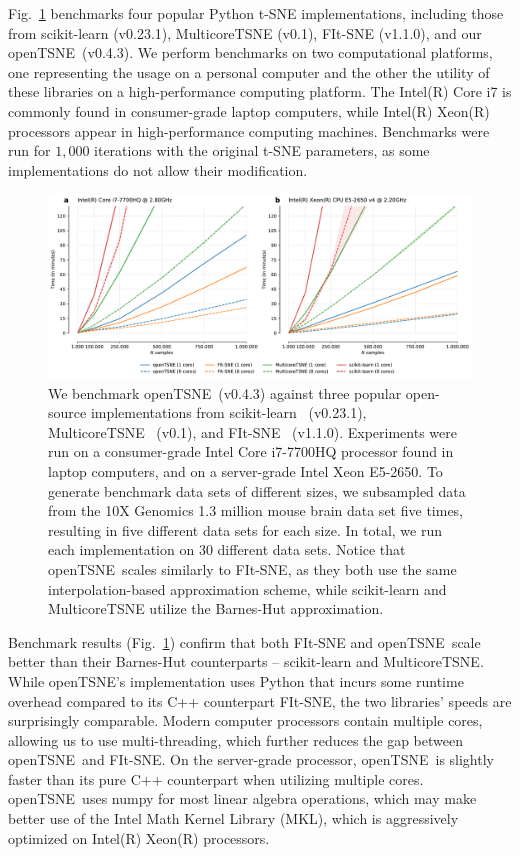 \documentclass[twocolumn]{bmcart}
\newcommand{\opentsne}{\textsf{openTSNE}}
\begin{document}
Fig.~\ref{fig:benchmarks} benchmarks four popular Python t-SNE implementations,
including those from \textsf{scikit-learn} (v0.23.1), \textsf{MulticoreTSNE}
(v0.1), \textsf{FIt-SNE} (v1.1.0), and our \opentsne\ (v0.4.3). We perform
benchmarks on two computational platforms, one representing the usage on a
personal computer and the other the utility of these libraries on a high-performance
computing platform. The Intel(R) Core i7 is commonly found in consumer-grade
laptop computers, while Intel(R) Xeon(R) processors appear in high-performance
computing machines. Benchmarks were run for $1,000$ iterations with the original
t-SNE parameters, as some implementations do not allow their modification. 

\begin{figure}[htbp]
  \includegraphics[width=\textwidth]{benchmarks}
  \caption{\label{fig:benchmarks}
  We benchmark \opentsne\ (v0.4.3) against three popular open-source implementations
  from \textsf{scikit-learn}~\cite{pedregosa2011scikit} (v0.23.1),
  \textsf{MulticoreTSNE}~\cite{Ulyanov2016} (v0.1), and
  \textsf{FIt-SNE}~\cite{linderman2019fast} (v1.1.0). Experiments were run on a
  consumer-grade Intel Core i7-7700HQ processor found in laptop computers,
  and on a server-grade Intel Xeon E5-2650. To generate benchmark data
  sets of different sizes, we subsampled data from the 10X Genomics 1.3
  million mouse brain data set five times, resulting in five different
  data sets for each size. In total, we run each implementation on 30
  different data sets. Notice that \opentsne\ scales similarly to \textsf{FIt-SNE},
  as they both use the same interpolation-based approximation scheme,
  while \textsf{scikit-learn} and \textsf{MulticoreTSNE} utilize the Barnes-Hut
  approximation.
}
\end{figure}

Benchmark results (Fig.~\ref{fig:benchmarks}) confirm that both \textsf{FIt-SNE}
and \opentsne\ scale better than their Barnes-Hut counterparts --
\textsf{scikit-learn} and \textsf{MulticoreTSNE}. While \opentsne's
implementation uses Python that incurs some runtime overhead compared to its C++
counterpart \textsf{FIt-SNE}, the two libraries' speeds are surprisingly
comparable. Modern computer processors contain multiple cores, allowing us to
use multi-threading, which further reduces the gap between \opentsne\ and
\textsf{FIt-SNE}. On the server-grade processor, \opentsne\ is slightly faster
than its pure C++ counterpart when utilizing multiple cores. \opentsne\ uses
\textsf{numpy} for most linear algebra operations, which may make better use of
the Intel Math Kernel Library (MKL), which is aggressively optimized on Intel(R)
Xeon(R) processors.  
\end{document}
